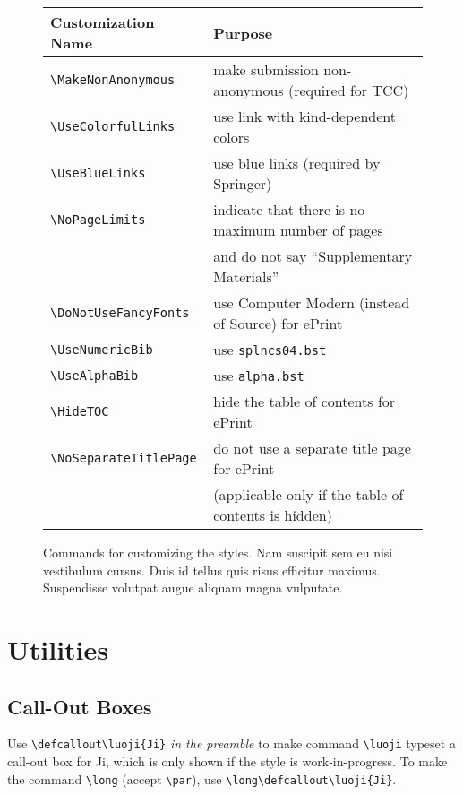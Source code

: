 \begin{figure}[h]
\centering
\begin{tabular}{ll}
\toprule
Customization Name & Purpose \\
\midrule
\texttt{\textbackslash MakeNonAnonymous} &
make submission non-anonymous (required for TCC) \\
\texttt{\textbackslash UseColorfulLinks} &
use link with kind-dependent colors \\
\texttt{\textbackslash UseBlueLinks} &
use blue links (required by Springer) \\
\texttt{\textbackslash NoPageLimits} &
indicate that there is no maximum number of pages \\
& \quad and do not say ``Supplementary Materials'' \\
\texttt{\textbackslash DoNotUseFancyFonts} &
use Computer Modern (instead of Source) for ePrint \\
\texttt{\textbackslash UseNumericBib} &
use \texttt{splncs04.bst} \\
\texttt{\textbackslash UseAlphaBib} &
use \texttt{alpha.bst} \\
\texttt{\textbackslash HideTOC} &
hide the table of contents for ePrint \\
\texttt{\textbackslash NoSeparateTitlePage} &
do not use a separate title page for ePrint \\
& \quad (applicable only if the table of contents is hidden) \\
\bottomrule
\end{tabular}
\caption{Commands for customizing the styles.
Nam suscipit sem eu nisi vestibulum cursus.
Duis id tellus quis risus efficitur maximus.
Suspendisse volutpat augue aliquam magna vulputate.}
\label{fig:figure1}
\end{figure}

\section{Utilities}

\subsection{Call-Out Boxes}

Use
\texttt{\textbackslash defcallout\textbackslash luoji\{Ji\}}
\emph{in the preamble}
to make
command \texttt{\textbackslash luoji} typeset a call-out box for Ji,
which is only shown if the style is work-in-progress.
To make the command
\texttt{\textbackslash long} (accept \texttt{\textbackslash par}),
use
\texttt{\textbackslash long\textbackslash defcallout\textbackslash luoji\{Ji\}}.

